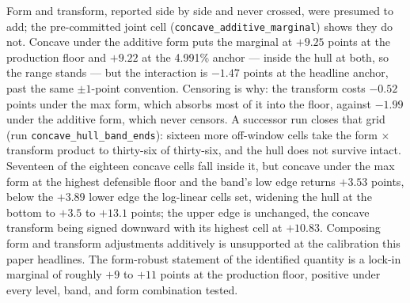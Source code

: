 Form and transform, reported side by side and never crossed, were presumed to add; the pre-committed joint cell (\texttt{concave\_additive\_marginal}) shows they do not. Concave under the additive form puts the marginal at $+9.25$ points at the production floor and $+9.22$ at the 4.991\% anchor --- inside the hull at both, so the range stands --- but the interaction is $-1.47$ points at the headline anchor, past the same $\pm 1$-point convention. Censoring is why: the transform costs $-0.52$ points under the max form, which absorbs most of it into the floor, against $-1.99$ under the additive form, which never censors. A successor run closes that grid (run \texttt{concave\_hull\_band\_ends}): sixteen more off-window cells take the form $\times$ transform product to thirty-six of thirty-six, and the hull does not survive intact. Seventeen of the eighteen concave cells fall inside it, but concave under the max form at the highest defensible floor and the band's low edge returns $+3.53$ points, below the $+3.89$ lower edge the log-linear cells set, widening the hull at the bottom to $+3.5$ to $+13.1$ points; the upper edge is unchanged, the concave transform being signed downward with its highest cell at $+10.83$. Composing form and transform adjustments additively is unsupported at the calibration this paper headlines. The form-robust statement of the identified quantity is a lock-in marginal of roughly $+9$ to $+11$ points at the production floor, positive under every level, band, and form combination tested.

